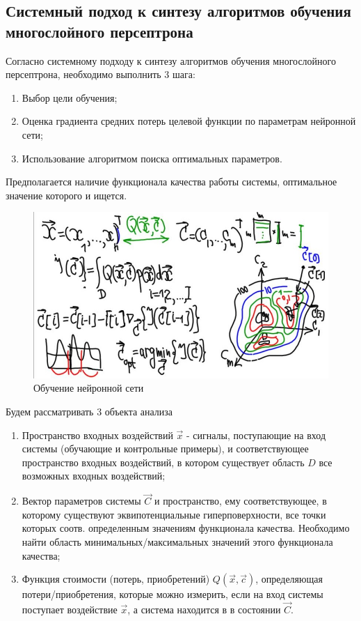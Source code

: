 \documentclass[a4paper]{article}
\numberwithin{equation}{subsection}
\begin{document}
\subsection{Системный подход к синтезу алгоритмов обучения многослойного персептрона}

Согласно системному подходу к синтезу алгоритмов обучения многослойного персептрона, 
необходимо выполнить 3 шага:
\begin{enumerate}
    \item Выбор цели обучения;
    \item Оценка градиента средних потерь целевой функции по параметрам нейронной сети;
    \item Использование алгоритмом поиска оптимальных параметров.
\end{enumerate}

Предполагается наличие функционала качества работы системы, оптимальное значение 
которого и ищется.

\begin{figure}[htbp]
    \centering
    \includegraphics[height=8 cm]{hyperflat_4_1.jpeg}
    \caption{Обучение нейронной сети}
    \label{hyperflat_4_1}
\end{figure}

Будем рассматривать 3 объекта анализа
\begin{enumerate}
    \item Пространство входных воздействий $\vec{x}$ - сигналы, поступающие на вход системы 
    (обучающие и контрольные примеры), и соответствующее пространство входных воздействий, 
    в котором существует область $D$ все возможных входных воздействий;
    \item Вектор параметров системы $\vec{C}$ и пространство, ему соответствующее, 
    в которому существуют эквипотенциальные гиперповерхности, все точки которых 
    соотв. определенным значениям функционала качества. Необходимо найти 
    область минимальных/максимальных значений этого функционала качества;
    \item Функция стоимости (потерь, приобретений) $Q(\vec{x}, \vec{c})$, 
    определяющая потери/приобретения, которые можно измерить, если на вход 
    системы поступает воздействие $\vec{x}$, а система находится в в состоянии $\vec{C}$.
\end{enumerate}
\end{document}
